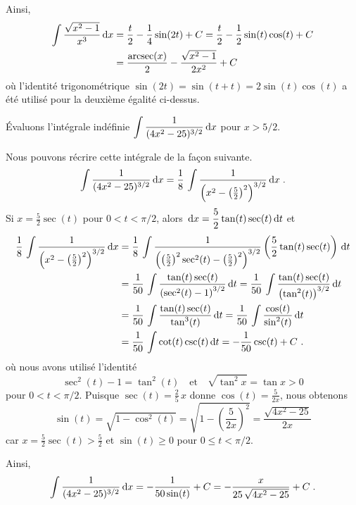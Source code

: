 {\begin{egg}
Ainsi,
\begin{align*}
\int \frac{\sqrt{x^2-1}}{x^3}  \,\mathrm{d}x
&= \frac{t}{2} - \frac{1}{4}\sin(2t) + C
= \frac{t}{2} - \frac{1}{2}\sin(t)\cos(t) + C \\
&= \frac{\operatorname{arcsec}(x)}{2} - \frac{\sqrt{x^2-1}}{2x^2} + C
\end{align*}
où l'identité trigonométrique $\sin(2t) = \sin(t+t) = 2\sin(t)\cos(t)$
a été utilisé pour la deuxième égalité ci-dessus.
\end{egg}

\begin{egg}
Évaluons l'intégrale indéfinie
$\displaystyle \int \frac{1}{(4x^2-25)^{3/2}} \,\mathrm{d}x$
pour $x>5/2$.

Nous pouvons récrire cette intégrale de la façon suivante.
\[
\int \frac{1}{(4x^2-25)^{3/2}} \,\mathrm{d}x
= \frac{1}{8} \, \int \frac{1}
{\left(x^2 - \left(\frac{5}{2}\right)^2\right)^{3/2}} \,\mathrm{d}x\; .
\]
Si $\displaystyle x = \frac{5}{2} \sec(t)$ pour
$0 < t < \pi/2$, alors
$\displaystyle \,\mathrm{d}x = \frac{5}{2} \tan(t)\sec(t) \,\mathrm{d}t$ et
\begin{align*}
\frac{1}{8} \, \int \frac{1}
{\left(x^2 - \left(\frac{5}{2}\right)^2\right)^{3/2}} \,\mathrm{d}x
&= \frac{1}{8} \,\int \frac{1} {\left(\left(\frac{5}{2}\right)^2\sec^2(t) -
\left(\frac{5}{2}\right)^2\right)^{3/2}}
\left( \frac{5}{2} \tan(t)\sec(t)\right) \,\mathrm{d}t \\
&= \frac{1}{50} \, \int
\frac{\tan(t)\sec(t)}{\left(\sec^2(t) - 1\right)^{3/2}} \,\mathrm{d}t
= \frac{1}{50} \, \int
\frac{\tan(t)\sec(t)}{\left(\tan^2(t)\right)^{3/2}} \,\mathrm{d}t \\
&= \frac{1}{50} \, \int \frac{\tan(t)\sec(t)}{\tan^3(t)} \,\mathrm{d}t
= \frac{1}{50} \, \int \frac{\cos(t)}{\sin^2(t)} \,\mathrm{d}t \\
& = \frac{1}{50} \, \int \cot(t) \csc(t) \,\mathrm{d}t
= - \frac{1}{50} \csc(t) + C \ .
\end{align*}
où nous avons utilisé l'identité
\[
\sec^2(t) -1 = \tan^2(t) \quad \text{et} \quad
\sqrt{\tan^2{x}} = \tan{x} > 0
\]
pour $0< t < \pi/2$.  Puisque $\displaystyle \sec(t) = \frac{2}{5}\, x$ donne
$\displaystyle \cos(t) = \frac{5}{2x}$, nous obtenons
\[
\sin(t) = \sqrt{1-\cos^2(t)} = \sqrt{1 -\left(\frac{5}{2x}\right)^2}
= \frac{\sqrt{4x^2-25}}{2x}
\]
car $\displaystyle x = \frac{5}{2}\sec(t) > \frac{5}{2} $ et
$\sin(t) \geq 0$ pour $0\leq t < \pi/2$.

Ainsi,
\[
\int \frac{1}{(4x^2-25)^{3/2}} \,\mathrm{d}x
= - \frac{1}{50\sin(t)} + C = - \frac{x}{25 \, \sqrt{4x^2-25}} + C \; .
\]
\end{egg}

}
